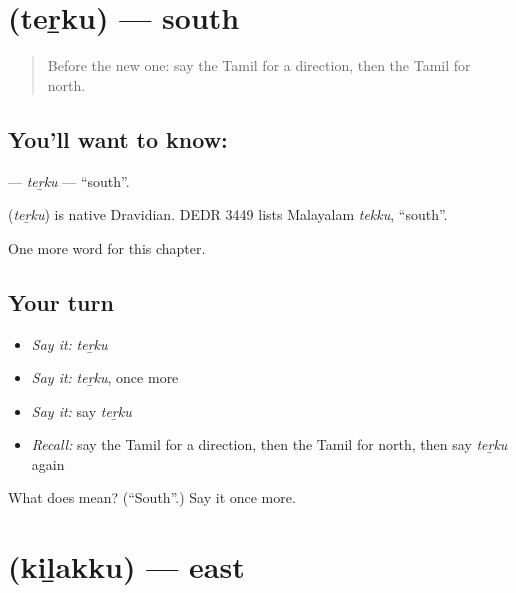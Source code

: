\section[\texorpdfstring{\ta{தெற்கு} (teṟku)}{தெற்கு (teṟku)}]{ (teṟku) — south}

\label{lesson:TA-C235-terku}



\begin{quote}
Before the new one: say the Tamil for a direction, then the Tamil for north.
\end{quote}

\subsection*{You'll want to know: }
\textbf{} — \emph{teṟku} — \textquotedblleft{}south\textquotedblright{}.

\begin{cousinweb}
\textbf{} (\emph{teṟku}) is native Dravidian. DEDR 3449 lists Malayalam \emph{tekku}, \textquotedblleft{}south\textquotedblright{}.
\end{cousinweb}

\begin{grammarlens}[title={What you've built}]
One more word for this chapter.
\end{grammarlens}

\subsection*{Your turn}
\begin{itemize}
\raggedright
  \item \emph{Say it:} \emph{teṟku}
  \item \emph{Say it:} \emph{teṟku}, once more
  \item \emph{Say it:} say \emph{teṟku}
  \item \emph{Recall:} say the Tamil for a direction, then the Tamil for north, then say \emph{teṟku} again
\end{itemize}

\begin{tcolorbox}[breakable,colback=teal!4,colframe=teal!35!black,title={Before you move on}]
What does  mean? (\textquotedblleft{}South\textquotedblright{}.) Say it once more.
\end{tcolorbox}
\section[\texorpdfstring{\ta{கிழக்கு} (kiḻakku)}{கிழக்கு (kiḻakku)}]{ (kiḻakku) — east}

